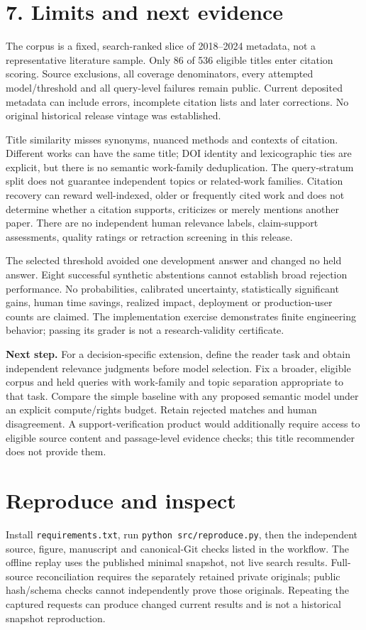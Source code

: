 \documentclass[10pt,letterpaper]{article}
\begin{document}
\newpage
\section*{7. Limits and next evidence}
The corpus is a fixed, search-ranked slice of 2018--2024 metadata, not a representative literature sample. Only 86 of 536 eligible titles enter citation scoring. Source exclusions, all coverage denominators, every attempted model/threshold and all query-level failures remain public. Current deposited metadata can include errors, incomplete citation lists and later corrections. No original historical release vintage was established.

Title similarity misses synonyms, nuanced methods and contexts of citation. Different works can have the same title; DOI identity and lexicographic ties are explicit, but there is no semantic work-family deduplication. The query-stratum split does not guarantee independent topics or related-work families. Citation recovery can reward well-indexed, older or frequently cited work and does not determine whether a citation supports, criticizes or merely mentions another paper. There are no independent human relevance labels, claim-support assessments, quality ratings or retraction screening in this release.

The selected threshold avoided one development answer and changed no held answer. Eight successful synthetic abstentions cannot establish broad rejection performance. No probabilities, calibrated uncertainty, statistically significant gains, human time savings, realized impact, deployment or production-user counts are claimed. The implementation exercise demonstrates finite engineering behavior; passing its grader is not a research-validity certificate.

\textbf{Next step.} For a decision-specific extension, define the reader task and obtain independent relevance judgments before model selection. Fix a broader, eligible corpus and held queries with work-family and topic separation appropriate to that task. Compare the simple baseline with any proposed semantic model under an explicit compute/rights budget. Retain rejected matches and human disagreement. A support-verification product would additionally require access to eligible source content and passage-level evidence checks; this title recommender does not provide them.

\section*{Reproduce and inspect}
Install \texttt{requirements.txt}, run \texttt{python src/reproduce.py}, then the independent source, figure, manuscript and canonical-Git checks listed in the workflow. The offline replay uses the published minimal snapshot, not live search results. Full-source reconciliation requires the separately retained private originals; public hash/schema checks cannot independently prove those originals. Repeating the captured requests can produce changed current results and is not a historical snapshot reproduction.
\end{document}
